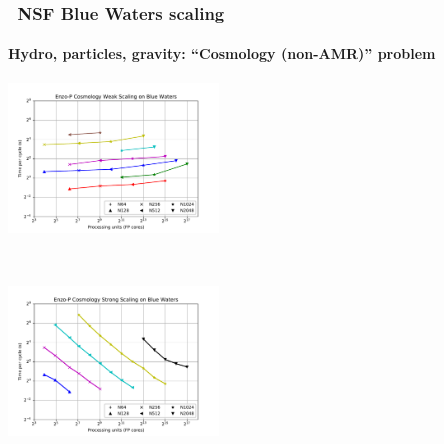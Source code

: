 \begin{frame}[fragile]
  \frametitle{\enzopcello\ NSF Blue Waters scaling}
  \framesubtitle{Hydro, particles, gravity: ``Cosmology (non-AMR)'' problem}
  \begin{center}
    \vspace{-0.1in}
    \begin{minipage}{4.5in}
      \begin{center}
        \begin{minipage}{2.in}
          \includegraphics[width=2.2in]{Images/Scaling/smp-cosmo-weak.pdf}
        \end{minipage} \ 
        \begin{minipage}{2.2in}
          \includegraphics[width=2.2in]{Images/Scaling/smp-cosmo-strong.pdf}
        \end{minipage} \\
      \end{center}
    \end{minipage}
  \end{center}
\end{frame}

